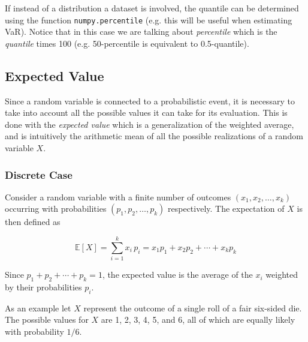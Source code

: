 If instead of a distribution a dataset is involved, the quantile can be determined using the function \texttt{numpy.percentile} (e.g. this will be useful when estimating VaR). Notice that in this case we are talking about \emph{percentile} which is the \emph{quantile} times 100 (e.g. 50-percentile is equivalent to 0.5-quantile).


\begin{ioutput}
[1.08 5.  ]
\end{ioutput}

\subsection{Expected Value}\label{sec:expected-value}

Since a random variable is connected to a probabilistic event, it is necessary to take into account all the possible values it can take for its evaluation. This is done with the \emph{expected value}
which is a generalization of the weighted average, and is intuitively the arithmetic mean of all the possible realizations of a random variable \(X\).

\subsubsection{Discrete Case}
Consider a random variable with a finite number of outcomes $(x_{1},x_{2},\ldots ,x_{k})$ occurring with probabilities $(p_{1},p_{2},\ldots ,p_{k})$ respectively. The expectation of $X$ is then defined as

\begin{equation}
	\mathbb{E}[X]=\sum _{i=1}^{k}x_{i}\,p_{i}=x_{1}p_{1}+x_{2}p_{2}+\cdots +x_{k}p_{k}
\end{equation}

Since $p_{1}+p_{2}+\cdots +p_{k}=1$, the expected value is the average of the $x_{i}$ weighted by their probabilities $p_{i}$.


As an example let $X$ represent the outcome of a single roll of a fair six-sided die. The possible values for $X$ are 1, 2, 3, 4, 5, and 6, all of which are equally likely with probability $1/6$.

